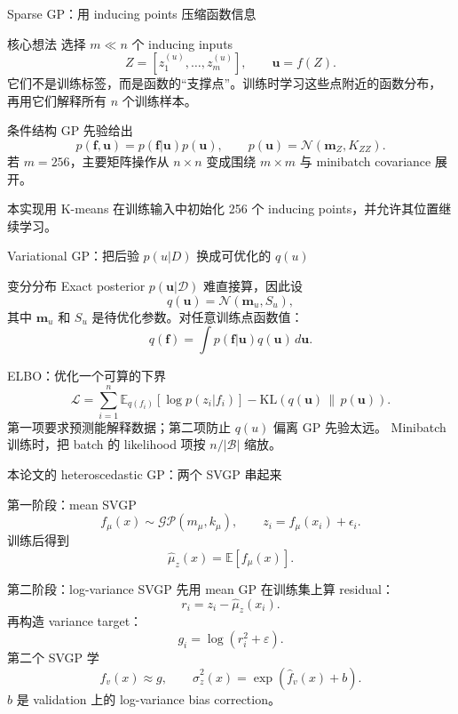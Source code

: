 \documentclass[aspectratio=169,11pt]{beamer}
\begin{document}
\begin{frame}{Sparse GP：用 inducing points 压缩函数信息}
\small
\begin{block}{核心想法}
\footnotesize
选择 \(m\ll n\) 个 inducing inputs
\[
Z=[z_1^{(u)},\ldots,z_m^{(u)}],
\qquad
\mathbf u=f(Z).
\]
它们不是训练标签，而是函数的“支撑点”。训练时学习这些点附近的函数分布，
再用它们解释所有 \(n\) 个训练样本。
\end{block}

\begin{block}{条件结构}
\footnotesize
GP 先验给出
\[
p(\mathbf f,\mathbf u)=p(\mathbf f|\mathbf u)p(\mathbf u),
\qquad
p(\mathbf u)=\mathcal N(\mathbf m_Z,K_{ZZ}).
\]
若 \(m=256\)，主要矩阵操作从 \(n\times n\) 变成围绕 \(m\times m\) 与 minibatch covariance 展开。
\end{block}

\footnotesize
本实现用 K-means 在训练输入中初始化 256 个 inducing points，并允许其位置继续学习。
\end{frame}

\begin{frame}{Variational GP：把后验 \(p(u|D)\) 换成可优化的 \(q(u)\)}
\small
\begin{block}{变分分布}
\footnotesize
Exact posterior \(p(\mathbf u|\mathcal D)\) 难直接算，因此设
\[
q(\mathbf u)=\mathcal N(\mathbf m_u,S_u),
\]
其中 \(\mathbf m_u\) 和 \(S_u\) 是待优化参数。对任意训练点函数值：
\[
q(\mathbf f)=\int p(\mathbf f|\mathbf u)q(\mathbf u)\,d\mathbf u.
\]
\end{block}

\begin{block}{ELBO：优化一个可算的下界}
\footnotesize
\[
\mathcal L
=
\sum_{i=1}^{n}
\mathbb E_{q(f_i)}[\log p(z_i|f_i)]
-
\mathrm{KL}\!\left(q(\mathbf u)\,\|\,p(\mathbf u)\right).
\]
第一项要求预测能解释数据；第二项防止 \(q(u)\) 偏离 GP 先验太远。
Minibatch 训练时，把 batch 的 likelihood 项按 \(n/|\mathcal B|\) 缩放。
\end{block}
\end{frame}

\begin{frame}{本论文的 heteroscedastic GP：两个 SVGP 串起来}
\small
\begin{block}{第一阶段：mean SVGP}
\footnotesize
\[
f_\mu(x)\sim\mathcal{GP}(m_\mu,k_\mu),
\qquad
z_i=f_\mu(x_i)+\epsilon_i.
\]
训练后得到
\[
\hat\mu_z(x)=\mathbb E[f_\mu(x)].
\]
\end{block}

\begin{block}{第二阶段：log-variance SVGP}
\footnotesize
先用 mean GP 在训练集上算 residual：
\[
r_i=z_i-\hat\mu_z(x_i).
\]
再构造 variance target：
\[
g_i=\log(r_i^2+\varepsilon).
\]
第二个 SVGP 学
\[
f_v(x)\approx g,\qquad
\hat\sigma_z^2(x)=\exp(\hat f_v(x)+b).
\]
\(b\) 是 validation 上的 log-variance bias correction。
\end{block}
\end{frame}
\end{document}
